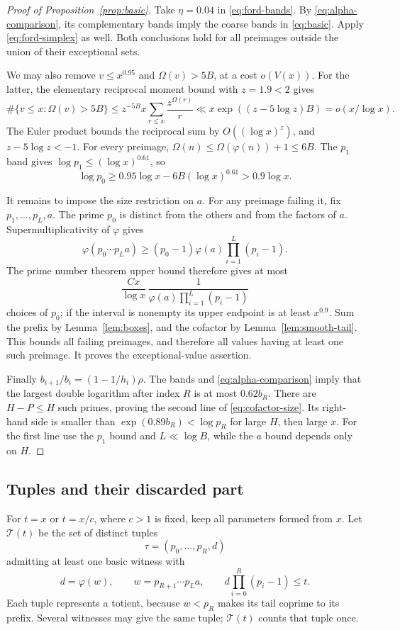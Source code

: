 \begin{proof}[Proof of Proposition~\ref{prop:basic}]
Take \(\eta=0.04\) in \eqref{eq:ford-bands}.  By
\eqref{eq:alpha-comparison}, its complementary bands imply the
coarse bands in \eqref{eq:basic}.  Apply
\eqref{eq:ford-simplex} as well.
Both conclusions hold for all preimages outside the union of their
exceptional sets.

We may also remove \(v\le x^{0.95}\) and \(\Omega(v)>5B\), at a
cost \(o(V(x))\).  For the latter, the elementary reciprocal moment
bound with \(z=1.9<2\) gives
\[
 \#\{v\le x:\Omega(v)>5B\}
 \le z^{-5B}x\sum_{r\le x}\frac{z^{\Omega(r)}}r
 \ll x\exp((z-5\log z)B)=o(x/\log x).
\]
The Euler product bounds the reciprocal sum by \(O((\log x)^z)\),
and \(z-5\log z<-1\).
For every preimage, \(\Omega(n)\le\Omega(\varphi(n))+1\le6B\).
The \(p_1\) band gives \(\log p_1\le(\log x)^{0.61}\), so
\[
 \log p_0\ge0.95\log x-6B(\log x)^{0.61}>0.9\log x.
\]

It remains to impose the size restriction on \(a\).  For any
preimage failing it, fix \(p_1,\ldots,p_L,a\).
The prime \(p_0\) is distinct from the others and from the factors
of \(a\).  Supermultiplicativity of \(\varphi\) gives
\[
 \varphi(p_0\cdots p_La)
 \ge(p_0-1)\varphi(a)\prod_{i=1}^L(p_i-1).
\]
The prime number theorem upper bound therefore gives at most
\[
 \frac{Cx}{\log x}\,
 \frac1{\varphi(a)\prod_{i=1}^L(p_i-1)}
\]
choices of \(p_0\); if the interval is nonempty its upper endpoint
is at least \(x^{0.9}\).  Sum the prefix by
Lemma~\ref{lem:boxes}, and the cofactor by
Lemma~\ref{lem:smooth-tail}.  This bounds all failing preimages,
and therefore all values having at least one such preimage.
It proves the exceptional-value assertion.

Finally \(b_{i+1}/b_i=(1-1/h_i)\rho\).
The bands and \eqref{eq:alpha-comparison} imply that the largest
double logarithm after index \(R\) is at most \(0.62b_R\).
There are \(H-P\le H\) such primes, proving the second line of
\eqref{eq:cofactor-size}.  Its right-hand side is smaller than
\(\exp(0.89b_R)<\log p_R\) for large \(H\), then large \(x\).
For the first line use the \(p_1\) bound and
\(L\ll\log B\), while the \(a\) bound depends only on \(H\).
\end{proof}

\subsection{Tuples and their discarded part}

For \(t=x\) or \(t=x/c\), where \(c>1\) is fixed, keep all
parameters formed from \(x\).  Let \(\mathcal T(t)\) be the set
of distinct tuples
\[
 \tau=(p_0,\ldots,p_R,d)
\]
admitting at least one basic witness with
\[
 d=\varphi(w),\qquad w=p_{R+1}\cdots p_La,\qquad
 d\prod_{i=0}^R(p_i-1)\le t.
\]
Each tuple represents a totient, because \(w<p_R\) makes its tail
coprime to its prefix.  Several witnesses may give the same tuple;
\(\mathcal T(t)\) counts that tuple once.

